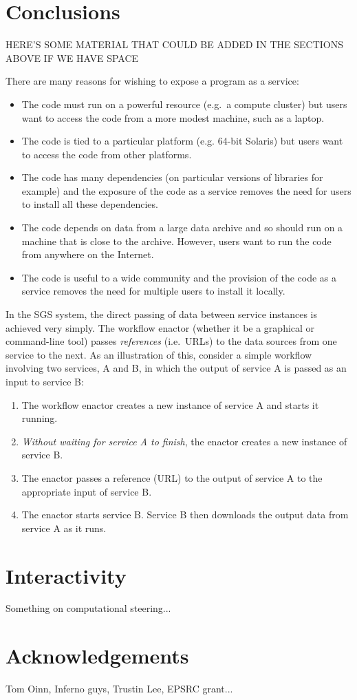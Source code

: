 \documentclass{llncs}
\begin{document}
\section{Conclusions}

HERE'S SOME MATERIAL THAT COULD BE ADDED IN THE SECTIONS ABOVE IF WE HAVE SPACE

There are many reasons for wishing to expose a program as a service:
\begin{itemize}
	\item The code must run on a powerful resource (e.g.\ a compute cluster) but users want to access the code from a more modest machine, such as a laptop.
	\item The code is tied to a particular platform (e.g. 64-bit Solaris) but users want to access the code from other platforms.
	\item The code has many dependencies (on particular versions of libraries for example) and the exposure of the code as a service removes the need for users to install all these dependencies.
	\item The code depends on data from a large data archive and so should run on a machine that is close to the archive.  However, users want to run the code from anywhere on the Internet.
	\item The code is useful to a wide community and the provision of the code as a service removes the need for multiple users to install it locally.
\end{itemize}

%
In the SGS system, the direct passing of data between service instances is achieved very simply.  The workflow enactor (whether it be a graphical or command-line tool) passes {\em references\/} (i.e.\ URLs) to the data sources from one service to the next.  As an illustration of this, consider a simple workflow involving two services, A and B, in which the output of service A is passed as an input to service B:
\begin{enumerate}
	\item The workflow enactor creates a new instance of service A and starts it running.
	\item {\em Without waiting for service A to finish\/}, the enactor creates a new instance of service B.
	\item The enactor passes a reference (URL) to the output of service A to the appropriate input of service B.
	\item The enactor starts service B.  Service B then downloads the output data from service A as it runs.
\end{enumerate}

%


\section{Interactivity} \label{sec:interactivity}
Something on computational steering...


\section*{Acknowledgements}
Tom Oinn, Inferno guys, Trustin Lee, EPSRC grant...
%
%


\end{document}

